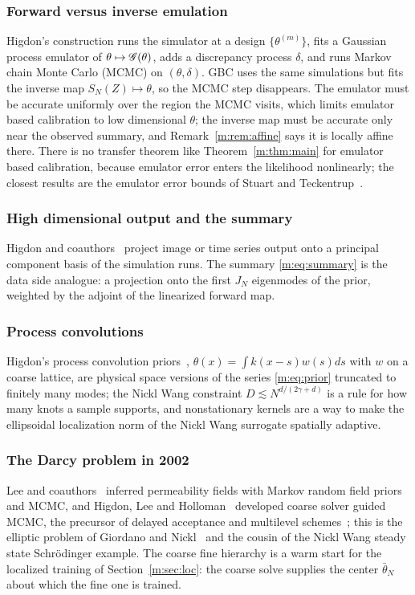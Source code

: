 \subsubsection{Forward versus inverse emulation} Higdon's construction runs the simulator at a design $\{\theta^{(m)}\}$, fits a Gaussian process emulator of $\theta\mapsto\mathscr{G}(\theta)$, adds a discrepancy process $\delta$, and runs Markov chain Monte Carlo (MCMC) on $(\theta,\delta)$. GBC uses the same simulations but fits the inverse map $S_N(Z)\mapsto\theta$, so the MCMC step disappears. The emulator must be accurate uniformly over the region the MCMC visits, which limits emulator based calibration to low dimensional $\theta$; the inverse map must be accurate only near the observed summary, and Remark~\ref{m:rem:affine} says it is locally affine there. There is no transfer theorem like Theorem~\ref{m:thm:main} for emulator based calibration, because emulator error enters the likelihood nonlinearly; the closest results are the emulator error bounds of Stuart and Teckentrup~\cite{stuartteckentrup2018}.

\subsubsection{High dimensional output and the summary} Higdon and coauthors~\cite{higdon2008} project image or time series output onto a principal component basis of the simulation runs. The summary \eqref{m:eq:summary} is the data side analogue: a projection onto the first $J_N$ eigenmodes of the prior, weighted by the adjoint of the linearized forward map.

\subsubsection{Process convolutions} Higdon's process convolution priors~\cite{higdon1998,higdon2002,higdon1999}, $\theta(x)=\int k(x-s)w(s)ds$ with $w$ on a coarse lattice, are physical space versions of the series \eqref{m:eq:prior} truncated to finitely many modes; the Nickl Wang constraint $D\lesssim N^{d/(2\gamma+d)}$ is a rule for how many knots a sample supports, and nonstationary kernels are a way to make the ellipsoidal localization norm of the Nickl Wang surrogate spatially adaptive.

\subsubsection{The Darcy problem in 2002} Lee and coauthors~\cite{lee2002} inferred permeability fields with Markov random field priors and MCMC, and Higdon, Lee and Holloman~\cite{higdon2003} developed coarse solver guided MCMC, the precursor of delayed acceptance and multilevel schemes~\cite{christenfox2005,dodwell2015}; this is the elliptic problem of Giordano and Nickl~\cite{giordanonickl2020} and the cousin of the Nickl Wang steady state Schr\"odinger example. The coarse fine hierarchy is a warm start for the localized training of Section~\ref{m:sec:loc}: the coarse solve supplies the center $\bar\theta_N$ about which the fine one is trained.

